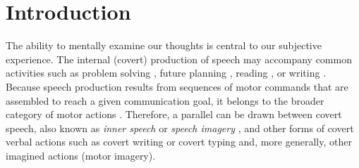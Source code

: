 \documentclass[utf8]{template/frontiersSCNS} %
\begin{document}
\newpage

\section{Introduction}

The ability to mentally examine our thoughts is central to our subjective experience. The internal (covert) production of speech may accompany common activities such as problem solving \citep{baldo_is_2005, sokolov_inner_1972}, future planning \citep{dargembeau_frequency_2011}, reading \citep[e.g.,][]{loevenbruck_left_2005, perrone-bertolotti_how_2012}, or writing \citep{frith_reading_1979}. Because speech production results from sequences of motor commands that are assembled to reach a given communication goal, it belongs to the broader category of motor actions \citep{jeannerod_motor_2006}. Therefore, a parallel can be drawn between covert speech, also known as \textit{inner speech} or \textit{speech imagery} \citep[for reviews, see][]{alderson-day_inner_2015, perrone-bertolotti_what_2014, loevenbruck_cognitive_2018}, and other forms of covert verbal actions such as covert writing or covert typing and, more generally, other imagined actions (motor imagery).

\end{document}
